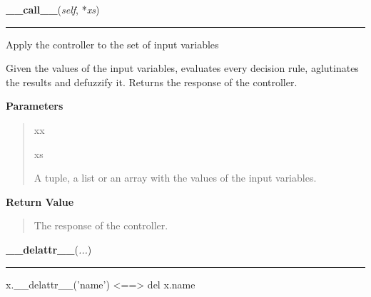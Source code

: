     \vspace{0.5ex}

    \begin{boxedminipage}{\textwidth}

    \raggedright \textbf{\_\_call\_\_}(\textit{self}, *\textit{xs})

    \vspace{-1.5ex}

    \rule{\textwidth}{0.5\fboxrule}

Apply the controller to the set of input variables

Given the values of the input variables, evaluates every decision rule,
aglutinates the results and defuzzify it. Returns the response of the
controller.
    \vspace{1ex}

      \textbf{Parameters}
      \begin{quote}
        \begin{Ventry}{xx}

          \item[xs]


A tuple, a list or an array with the values of the input variables.
        \end{Ventry}

      \end{quote}

    \vspace{1ex}

      \textbf{Return Value}
      \begin{quote}

The response of the controller.
      \end{quote}

    \vspace{1ex}

    \end{boxedminipage}

    \label{object:__delattr__}

    \vspace{0.5ex}

    \begin{boxedminipage}{\textwidth}

    \raggedright \textbf{\_\_delattr\_\_}(\textit{...})

    \vspace{-1.5ex}

    \rule{\textwidth}{0.5\fboxrule}

x.{\_}{\_}delattr{\_}{\_}('name') {\textless}=={\textgreater} del x.name
    \vspace{1ex}

    \end{boxedminipage}

